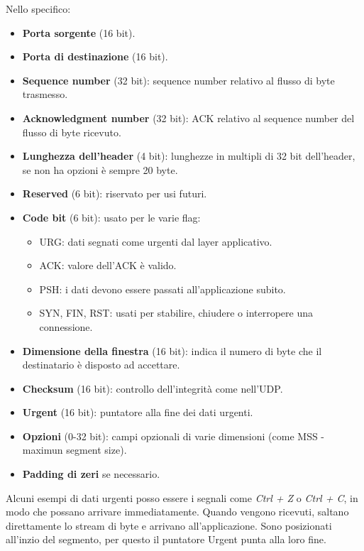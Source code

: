 Nello specifico:
\begin{itemize}
    \item \textbf{Porta sorgente} (16 bit).
    \item \textbf{Porta di destinazione} (16 bit).
    \item \textbf{Sequence number} (32 bit): sequence number relativo al flusso di byte trasmesso.
    \item \textbf{Acknowledgment number} (32 bit): ACK relativo al sequence number del flusso di byte ricevuto.
    \item \textbf{Lunghezza dell'header} (4 bit): lunghezze in multipli di 32 bit dell'header, se non ha opzioni è sempre 20 byte.
    \item \textbf{Reserved} (6 bit): riservato per usi futuri.
    \item \textbf{Code bit} (6 bit): usato per le varie flag:
    \begin{itemize}
        \item URG: dati segnati come urgenti dal layer applicativo.
        \item ACK: valore dell'ACK è valido.
        \item PSH: i dati devono essere passati all'applicazione subito.
        \item SYN, FIN, RST: usati per stabilire, chiudere o interropere una connessione.
    \end{itemize}
    \item \textbf{Dimensione della finestra} (16 bit): indica il numero di byte che il destinatario è disposto ad accettare.
    \item \textbf{Checksum} (16 bit): controllo dell'integrità come nell'UDP.
    \item \textbf{Urgent} (16 bit): puntatore alla fine dei dati urgenti.
    \item \textbf{Opzioni} (0-32 bit): campi opzionali di varie dimensioni (come MSS - maximun segment size).
    \item \textbf{Padding di zeri} se necessario.
\end{itemize}
Alcuni esempi di dati urgenti posso essere i segnali come \textit{Ctrl + Z} o \textit{Ctrl + C}, in modo che possano arrivare immediatamente. Quando vengono ricevuti, saltano direttamente lo stream di byte e arrivano all'applicazione. Sono posizionati all'inzio del segmento, per questo il puntatore Urgent punta alla loro fine.

\newpage
